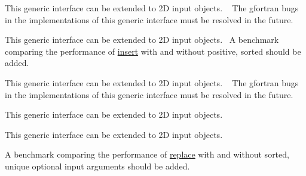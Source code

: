 
\begin{DoxyRefList}
\item[Type \mbox{\hyperlink{interfaceArrayComparison__mod_1_1iseqall}{Array\+Comparison\+\_\+mod\+::iseqall}} ]\label{todo__todo000001}%
%
 This generic interface can be extended to 2D input objects. ~\newline
 The gfortran bugs in the implementations of this generic interface must be resolved in the future. ~\newline
 
\item[Type \mbox{\hyperlink{interfaceArrayInsert__mod_1_1insert}{Array\+Insert\+\_\+mod\+::insert}} ]\label{todo__todo000002}%
%
 This generic interface can be extended to 2D input objects.~\newline
 A benchmark comparing the performance of \mbox{\hyperlink{interfaceArrayInsert__mod_1_1insert}{insert}} with and without {\ttfamily positive, sorted} should be added.~\newline
 
\item[Type \mbox{\hyperlink{interfaceArrayRemap__mod_1_1remap}{Array\+Remap\+\_\+mod\+::remap}} ]\label{todo__todo000003}%
%
 This generic interface can be extended to 2D input objects. ~\newline
 The gfortran bugs in the implementations of this generic interface must be resolved in the future. ~\newline
 
\item[Type \mbox{\hyperlink{interfaceArrayRemove__mod_1_1genRemoved}{Array\+Remove\+\_\+mod\+::gen\+Removed}} ]\label{todo__todo000004}%
%
 This generic interface can be extended to 2D input objects. ~\newline
 
\item[Type \mbox{\hyperlink{interfaceArrayRemove__mod_1_1remove}{Array\+Remove\+\_\+mod\+::remove}} ]\label{todo__todo000005}%
%
 This generic interface can be extended to 2D input objects. ~\newline
 
\item[Type \mbox{\hyperlink{interfaceArrayReplace__mod_1_1genReplaced}{Array\+Replace\+\_\+mod\+::gen\+Replaced}} ]\label{todo__todo000008}%
%
 A benchmark comparing the performance of \mbox{\hyperlink{interfaceArrayReplace__mod_1_1replace}{replace}} with and without {\ttfamily sorted, unique} optional input arguments should be added.


\end{DoxyRefList}
